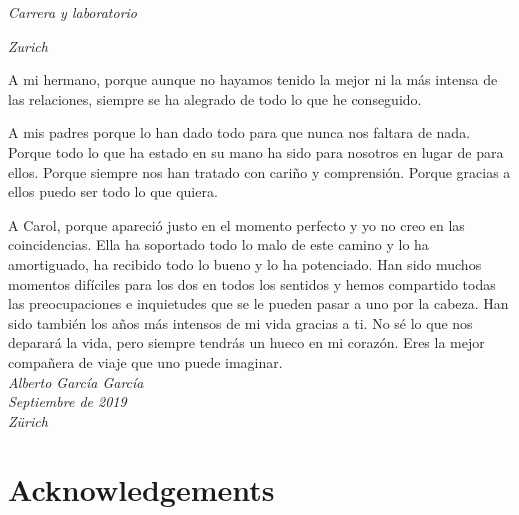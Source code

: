 \emph{Carrera y laboratorio}

\emph{Zurich}

A mi hermano, porque aunque no hayamos tenido la mejor ni la más intensa de las relaciones, siempre se ha alegrado de todo lo que he conseguido.

A mis padres porque lo han dado todo para que nunca nos faltara de nada. Porque todo lo que ha estado en su mano ha sido para nosotros en lugar de para ellos. Porque siempre nos han tratado con cariño y comprensión. Porque gracias a ellos puedo ser todo lo que quiera.

A Carol, porque apareció justo en el momento perfecto y yo no creo en las coincidencias. Ella ha soportado todo lo malo de este camino y lo ha amortiguado, ha recibido todo lo bueno y lo ha potenciado. Han sido muchos momentos difíciles para los dos en todos los sentidos y hemos compartido todas las preocupaciones e inquietudes que se le pueden pasar a uno por la cabeza. Han sido también los años más intensos de mi vida gracias a ti. No sé lo que nos deparará la vida, pero siempre tendrás un hueco en mi corazón. Eres la mejor compañera de viaje que uno puede imaginar.\\

\emph{Alberto García García}\\
\emph{Septiembre de 2019}\\
\emph{Zürich}\\

\chapter{Acknowledgements}

\lipsum[3]
\lipsum[2]
\lipsum[4]
\lipsum[5]
\lipsum[6]
